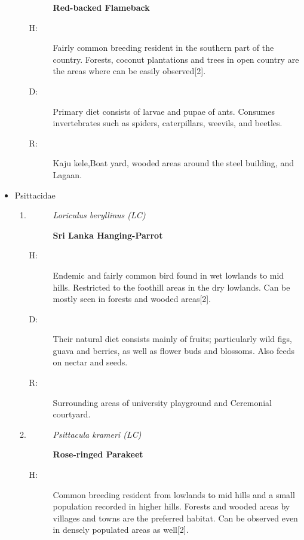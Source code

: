 \begin{itemize}
\begin{enumerate}
\begin{description}
\textbf{Red{-}backed Flameback}%
\end{description}%
\begin{description}%
\item[H: ]%
Fairly common breeding resident in the southern part of the country. Forests, coconut plantations and trees in open country are the areas where can be easily observed{[}2{]}.%
\item[D: ]%
Primary diet consists of larvae and pupae of ants. Consumes invertebrates such as spiders, caterpillars, weevils, and beetles.%
\item[R: ]%
Kaju kele,Boat yard, wooded areas around the steel building, and Lagaan.%
\end{description}%
\end{enumerate}%
\item%
Psittacidae%
\begin{enumerate}%
\item%
\begin{description}%
\item[]%
\textit{Loriculus beryllinus (LC)}%
\item[]%
\textbf{Sri Lanka Hanging{-}Parrot}%
\end{description}%
\begin{description}%
\item[H: ]%
Endemic and fairly common bird found in wet lowlands to mid hills. Restricted to the foothill areas in the dry lowlands. Can be mostly seen in forests and wooded areas{[}2{]}.%
\item[D: ]%
Their natural diet consists mainly of fruits; particularly wild figs, guava and berries, as well as flower buds and blossoms. Also feeds on nectar and seeds.%
\item[R: ]%
Surrounding areas of university playground and Ceremonial courtyard.%
\end{description}%
\item%
\begin{description}%
\item[]%
\textit{Psittacula krameri (LC)}%
\item[]%
\textbf{Rose{-}ringed Parakeet}%
\end{description}%
\begin{description}%
\item[H: ]%
Common breeding resident from lowlands to mid hills and a small population recorded in higher hills. Forests and wooded areas by villages and towns are the preferred habitat. Can be observed even in densely populated areas as well{[}2{]}.%

\end{description}
\end{enumerate}
\end{itemize}
